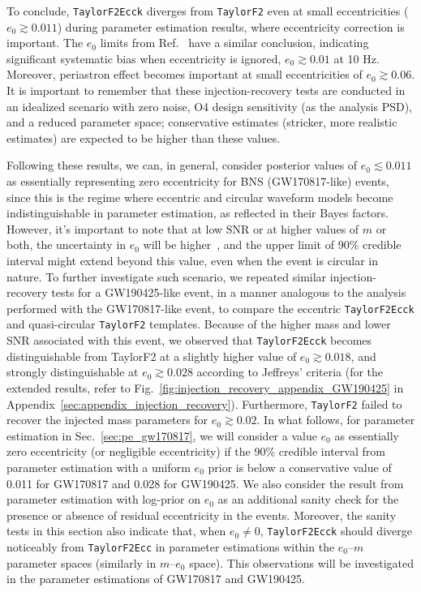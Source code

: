 \documentclass[aps,prd,twocolumn,superscriptaddress,groupedaddress,nofootinbib,showpacs,eqsecnum,useAms]{revtex4-2}
\begin{document}
To conclude, \texttt{TaylorF2Ecck} diverges from \texttt{TaylorF2} even at small eccentricities ($e_0\gtrsim 0.011$) during  parameter estimation results, where eccentricity correction is important. 
The $e_0$ limits from Ref.~\cite{Favata2022} have a similar conclusion, indicating significant systematic bias when eccentricity is ignored, $e_0\gtrsim 0.01$ at 10 Hz. 
Moreover, periastron effect becomes important at small eccentricities of $e_0\gtrsim 0.06$. It is important to remember that these injection-recovery tests are conducted in an idealized scenario with zero noise, O4 design sensitivity (as the analysis PSD), and a reduced parameter space; conservative estimates (stricker, more realistic estimates) are expected to be higher than these values.
%

Following these results, we can, in general, consider posterior values of $e_0\lesssim 0.011$ as essentially representing zero eccentricity for BNS (GW170817-like) events, since this is the regime where eccentric and circular waveform models become indistinguishable 
in parameter estimation, as reflected in their Bayes factors.
However, it's important to note that at low SNR or at higher values of $m$ or both, the uncertainty in $e_0$ will be higher~\cite{Favata2022}, and the upper limit of 90\% credible interval might extend beyond this value, even when the event is circular in nature. 
To further investigate such scenario, we repeated similar injection-recovery tests for a GW190425-like event, in a manner analogous to the analysis performed with the GW170817-like event, to compare the eccentric \texttt{TaylorF2Ecck} and quasi-circular \texttt{TaylorF2} templates. Because of the higher mass and lower SNR associated with this event, we observed that \texttt{TaylorF2Ecck} becomes distinguishable from TaylorF2
at a slightly higher value of $e_0\gtrsim 0.018$, and strongly distinguishable at $e_0\gtrsim 0.028$ according to Jeffreys' criteria (for the extended results, refer to Fig.~\ref{fig:injection_recovery_appendix_GW190425} in Appendix~\ref{sec:appendix_injection_recovery}). 
%
Furthermore, \texttt{TaylorF2} failed to recover the injected mass parameters for $e_0 \gtrsim 0.02$.
In what follows, for parameter estimation in Sec.~\ref{sec:pe_gw170817}, we will consider a value $e_0$ as essentially zero eccentricity (or negligible eccentricity) if the 90\% credible interval from parameter estimation with a uniform $e_0$ prior is below a conservative value of 0.011 for GW170817 and 0.028 for GW190425. We also consider the result from parameter estimation with log-prior on $e_0$ as an additional sanity check for the presence or absence of residual eccentricity in the events.
Moreover, the sanity tests in this section also indicate that, when $e_0\neq 0$, \texttt{TaylorF2Ecck} should diverge noticeably from \texttt{TaylorF2Ecc} in parameter estimations within the $e_0$--$m$ parameter spaces (similarly in $m$--$e_0$ space). This observations will be investigated in the parameter estimations of GW170817 and GW190425.
\end{document}
